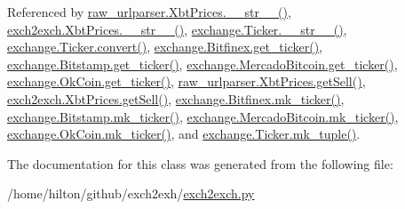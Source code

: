 Referenced by \hyperlink{raw__urlparser_8py_source_l00074}{raw\+\_\+urlparser.\+Xbt\+Prices.\+\_\+\+\_\+str\+\_\+\+\_\+()}, \hyperlink{exch2exch_8py_source_l00091}{exch2exch.\+Xbt\+Prices.\+\_\+\+\_\+str\+\_\+\+\_\+()}, \hyperlink{exchange_8py_source_l00111}{exchange.\+Ticker.\+\_\+\+\_\+str\+\_\+\+\_\+()}, \hyperlink{exchange_8py_source_l00065}{exchange.\+Ticker.\+convert()}, \hyperlink{exchange_8py_source_l00332}{exchange.\+Bitfinex.\+get\+\_\+ticker()}, \hyperlink{exchange_8py_source_l00401}{exchange.\+Bitstamp.\+get\+\_\+ticker()}, \hyperlink{exchange_8py_source_l00535}{exchange.\+Mercado\+Bitcoin.\+get\+\_\+ticker()}, \hyperlink{exchange_8py_source_l00600}{exchange.\+Ok\+Coin.\+get\+\_\+ticker()}, \hyperlink{raw__urlparser_8py_source_l00065}{raw\+\_\+urlparser.\+Xbt\+Prices.\+get\+Sell()}, \hyperlink{exch2exch_8py_source_l00073}{exch2exch.\+Xbt\+Prices.\+get\+Sell()}, \hyperlink{exchange_8py_source_l00346}{exchange.\+Bitfinex.\+mk\+\_\+ticker()}, \hyperlink{exchange_8py_source_l00415}{exchange.\+Bitstamp.\+mk\+\_\+ticker()}, \hyperlink{exchange_8py_source_l00549}{exchange.\+Mercado\+Bitcoin.\+mk\+\_\+ticker()}, \hyperlink{exchange_8py_source_l00614}{exchange.\+Ok\+Coin.\+mk\+\_\+ticker()}, and \hyperlink{exchange_8py_source_l00096}{exchange.\+Ticker.\+mk\+\_\+tuple()}.



The documentation for this class was generated from the following file\+:\begin{DoxyCompactItemize}
\item 
/home/hilton/github/exch2exh/\hyperlink{exch2exch_8py}{exch2exch.\+py}\end{DoxyCompactItemize}
